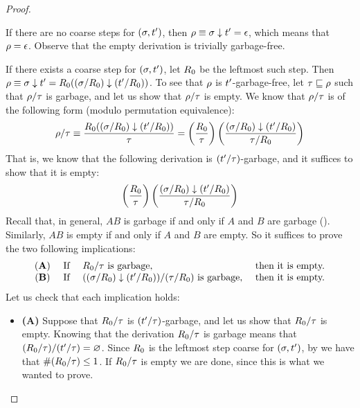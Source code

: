 \begin{proof}
\begin{itemize}
  If there are no coarse steps for $(\sigma,t')$,
  then $\rho \equiv \sigma \downarrow t' = \epsilon$, which means that $\rho = \epsilon$.
  Observe that the empty derivation is trivially garbage-free.

  If there exists a coarse step for $(\sigma,t')$,
  let $R_0$ be the leftmost such step.
  Then $\rho \equiv \sigma \downarrow t' = R_0((\sigma/R_0) \downarrow (t'/R_0))$.
  To see that $\rho$ is $t'$-garbage-free,
  let $\tau \sqsubseteq \rho$ such that $\rho/\tau$ is garbage,
  and let us show that $\rho/\tau$ is empty. 
  We know that $\rho/\tau$ is of the following form (modulo permutation equivalence):
  \[
     \rho/\tau \equiv
     \frac{R_0((\sigma/R_0) \downarrow (t'/R_0))}{\tau}
     =
     \left(\frac{R_0}{\tau}\right) \left(\frac{(\sigma/R_0) \downarrow (t'/R_0)}{\tau/R_0}\right)
  \]
  That is, we know that the following derivation is $(t'/\tau)$-garbage,
  and it suffices to show that it is empty:
  \[
    \left(\frac{R_0}{\tau}\right) \left(\frac{(\sigma/R_0) \downarrow (t'/R_0)}{\tau/R_0}\right)
  \]
  Recall that, in general, $AB$ is garbage if and only if $A$ and $B$ are garbage ().
  Similarly, $AB$ is empty if and only if $A$ and $B$ are empty.
  So it suffices to prove the two following implications:
  \[
    \begin{array}{clll}
    {\bf (A)} &
    \text{ If } & R_0/\tau \text{ is garbage,} & \text{ then it is empty.} \\
    {\bf (B)} &
    \text{ If } & ((\sigma/R_0) \downarrow (t'/R_0))/(\tau/R_0) \text{ is garbage,} & \text{ then it is empty.}
    \end{array}
  \]
  Let us check that each implication holds:
  \begin{itemize}
  \item {\bf (A)}
    Suppose that $R_0/\tau$ is $(t'/\tau)$-garbage,
    and let us show that $R_0/\tau$ is empty.
    Knowing that the derivation $R_0/\tau$ is garbage means that
    $(R_0/\tau)/(t'/\tau) = \varnothing$.
    Since $R_0$ is the leftmost step coarse for $(\sigma,t')$,
    by 
    we have that $\#(R_0/\tau) \leq 1$.
    If $R_0/\tau$ is empty we are done, since this is what we wanted to prove.


\end{itemize}
\end{itemize}
\end{proof}
